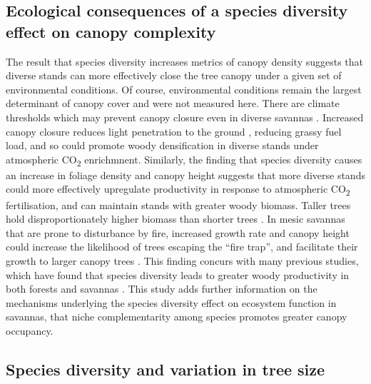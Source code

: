 \documentclass[11pt,a4paper]{article}
\begin{document}
\subsection{Ecological consequences of a species diversity effect on canopy complexity}

The result that species diversity increases metrics of canopy density suggests that diverse stands can more effectively close the tree canopy under a given set of environmental conditions. Of course, environmental conditions remain the largest determinant of canopy cover and were not measured here. There are climate thresholds which may prevent canopy closure even in diverse savannas \citep{Devine2017}. Increased canopy closure reduces light penetration to the ground \citep{Pilon2020}, reducing grassy fuel load, and so could promote woody densification in diverse stands under atmospheric CO\textsubscript{2} enrichmnent. Similarly, the finding that species diversity causes an increase in foliage density and canopy height suggests that more diverse stands could more effectively upregulate productivity in response to atmospheric CO\textsubscript{2} fertilisation, and can maintain stands with greater woody biomass. Taller trees hold disproportionately higher biomass than shorter trees \citep{King1990}. In mesic savannas that are prone to disturbance by fire, increased growth rate and canopy height could increase the likelihood of trees escaping the ``fire trap'', and facilitate their growth to larger canopy trees \citep{Wakeling2011}. This finding concurs with many previous studies, which have found that species diversity leads to greater woody productivity in both forests and savannas \citep{Plas2019, Liang2016}. This study adds further information on the mechanisms underlying the species diversity effect on ecosystem function in savannas, that niche complementarity among species promotes greater canopy occupancy.

\subsection{Species diversity and variation in tree size}
\end{document}
